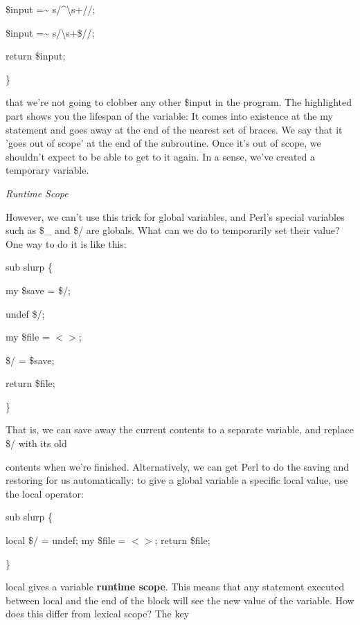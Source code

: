 \documentclass[a4paper,11pt]{book}
\begin{document}
\noindent \$input =\~{} s/\^{}\textbackslash s+//;

\noindent \$input =\~{} s/\textbackslash s+\$//;

\noindent return \$input;

\noindent \}

\noindent 

\noindent that we're not going to clobber any other \$input in the program. The highlighted part shows you the lifespan of the variable: It comes into existence at the my statement and goes away at the end of the nearest set of braces. We say that it 'goes out of scope' at the end of the subroutine. Once it's out of scope, we shouldn't expect to be able to get to it again. In a sense, we've created a temporary variable.

\noindent 

\noindent \textit{Runtime Scope}

\noindent However, we can't use this trick for global variables, and Perl's special variables such as \$\_ and \$/ are globals. What can we do to temporarily set their value? One way to do it is like this:

\noindent 

\noindent 

\noindent sub slurp \{

\noindent my \$save = \$/;

\noindent undef \$/;

\noindent my \$file = $<$$>$;

\noindent \$/ = \$save;

\noindent return \$file;

\noindent \}

\noindent 

\noindent 

\noindent That is, we can save away the current contents to a separate variable, and replace \$/ with its old

\noindent contents when we're finished. Alternatively, we can get Perl to do the saving and restoring for us automatically: to give a global variable a specific local value, use the local operator:

\noindent 

\noindent sub slurp \{

\noindent local \$/ = undef; my \$file = $<$$>$; return \$file;

\noindent \}

\noindent 

\noindent local gives a variable \textbf{runtime scope}. This means that any statement executed between local and the end of the block will see the new value of the variable. How does this differ from lexical scope? The key
\end{document}
